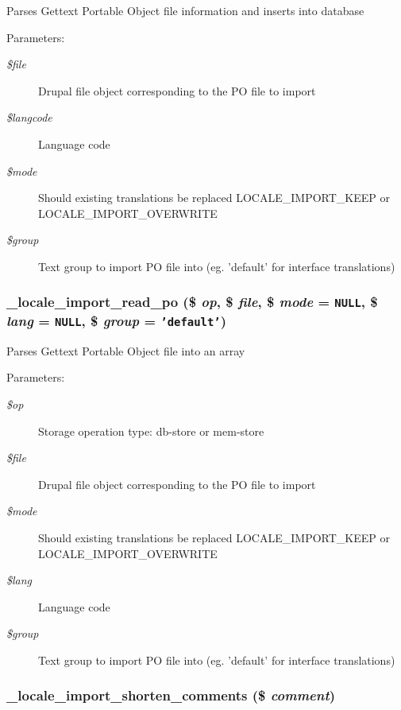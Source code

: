Parses Gettext Portable Object file information and inserts into database

\begin{Desc}
\item[Parameters:]
\begin{description}
\item[{\em \$file}]Drupal file object corresponding to the PO file to import \item[{\em \$langcode}]Language code \item[{\em \$mode}]Should existing translations be replaced LOCALE\_\-IMPORT\_\-KEEP or LOCALE\_\-IMPORT\_\-OVERWRITE \item[{\em \$group}]Text group to import PO file into (eg. 'default' for interface translations) \end{description}
\end{Desc}
\hypertarget{group__locale_g97099fd0b115843fd4d443686a3ca35d}{
\subsubsection[{\_\-locale\_\-import\_\-read\_\-po}]{\setlength{\rightskip}{0pt plus 5cm}\_\-locale\_\-import\_\-read\_\-po (\$ {\em op}, \/  \$ {\em file}, \/  \$ {\em mode} = {\tt NULL}, \/  \$ {\em lang} = {\tt NULL}, \/  \$ {\em group} = {\tt 'default'})}}
\label{group__locale_g97099fd0b115843fd4d443686a3ca35d}


Parses Gettext Portable Object file into an array

\begin{Desc}
\item[Parameters:]
\begin{description}
\item[{\em \$op}]Storage operation type: db-store or mem-store \item[{\em \$file}]Drupal file object corresponding to the PO file to import \item[{\em \$mode}]Should existing translations be replaced LOCALE\_\-IMPORT\_\-KEEP or LOCALE\_\-IMPORT\_\-OVERWRITE \item[{\em \$lang}]Language code \item[{\em \$group}]Text group to import PO file into (eg. 'default' for interface translations) \end{description}
\end{Desc}
\hypertarget{group__locale_g1cba05a4c159b1ed844f18ba484cc8e7}{
\subsubsection[{\_\-locale\_\-import\_\-shorten\_\-comments}]{\setlength{\rightskip}{0pt plus 5cm}\_\-locale\_\-import\_\-shorten\_\-comments (\$ {\em comment})}}
\label{group__locale_g1cba05a4c159b1ed844f18ba484cc8e7}


